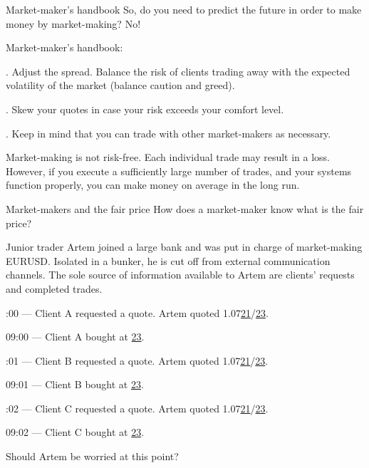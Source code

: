 \documentclass{beamer}
\begin{document}
\begin{frame}{Market-maker's handbook}
\justify
So, do you need to predict the future in order to make money by market-making? No!

\justify
Market-maker's handbook:

. Adjust the spread. Balance the risk of clients trading away with the expected volatility of the market (balance caution and greed).

. Skew your quotes in case your risk exceeds your comfort level.

. Keep in mind that you can trade with other market-makers as necessary.

\justify
Market-making is not risk-free. Each individual trade may result in a loss. However, if you execute a sufficiently large number of trades, and your systems function properly, you can make money on average in the long run.
\end{frame}



\begin{frame}{Market-makers and the fair price}
\justify
How does a market-maker know what is the \alert{fair} price?

\justify
Junior trader Artem joined a large bank and was put in charge of market-making EURUSD. Isolated in a bunker, he is cut off from external communication channels. The sole source of information available to Artem are clients' requests and completed trades.

:00 --- Client A requested a quote. Artem quoted 1.07\underline{21}/\underline{23}.

09:00 --- Client A bought at \underline{23}.

:01 --- Client B requested a quote. Artem quoted 1.07\underline{21}/\underline{23}.

09:01 --- Client B bought at \underline{23}.

:02 --- Client C requested a quote. Artem quoted 1.07\underline{21}/\underline{23}.

09:02 --- Client C bought at \underline{23}.

\justify
Should Artem be worried at this point?
\end{frame}
\end{document}
